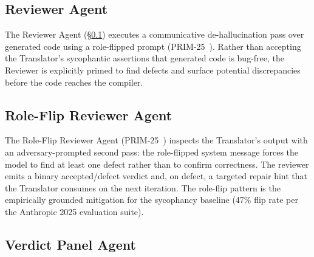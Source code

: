 \subsection{Reviewer Agent}
\label{sec:method_reviewer}

The Reviewer Agent (§\ref{sec:method_reviewer}) executes a communicative
de-hallucination pass over generated code using a role-flipped prompt
(PRIM-25~\cite{p46_chatdev_deepread}). Rather than accepting the Translator's
sycophantic assertions that generated code is bug-free, the Reviewer
is explicitly primed to find defects and surface potential discrepancies
before the code reaches the compiler.

\subsection{Role-Flip Reviewer Agent}
\label{sec:method_roleflip}

The Role-Flip Reviewer Agent (PRIM-25~\cite{p46_chatdev_deepread,p69_anthropic_sycophancy_2025_acl,p81_gorilla_2023,p85_function_calling_yue_2025_unverified}) inspects the Translator's
output with an adversary-prompted second pass: the role-flipped system message
forces the model to find at least one defect rather than to confirm correctness.
The reviewer emits a binary accepted/defect verdict and, on defect, a targeted
repair hint that the Translator consumes on the next iteration. The role-flip
pattern is the empirically grounded mitigation for the sycophancy baseline
(47\% flip rate per the Anthropic 2025 evaluation suite).

\subsection{Verdict Panel Agent}
\label{sec:method_verdict}


